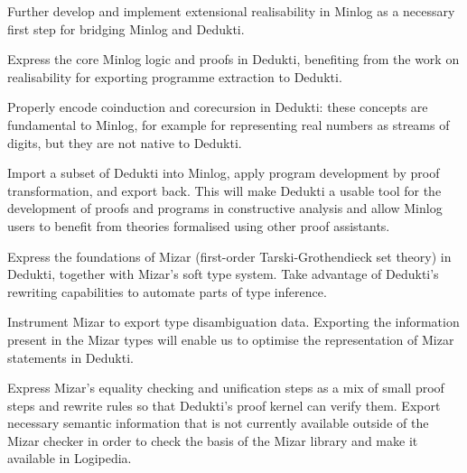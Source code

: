 \begin{workpackage}
\begin{tasklist}
\begin{task}[id=minlog,
  title=Express the theory of Minlog in Dedukti,
  shorttitle=Minlog,
  lead=Lmu,
  LmuRM=16, %
  wphases=1-30,
  ]
  \vspace{-5mm}
  \begin{compactitem}
  \item Further develop and implement extensional realisability in Minlog as
    a necessary first step for bridging Minlog and Dedukti.
  \item Express the core Minlog logic and proofs in Dedukti, benefiting from
    the work on realisability for exporting programme extraction to Dedukti.
  \item Properly encode coinduction and corecursion in Dedukti: these concepts are
    fundamental to Minlog, for example for representing real numbers as streams of
    digits, but they are not native to Dedukti.
  \item Import a subset of Dedukti into Minlog, apply program development by proof
    transformation, and export back. This will make Dedukti a usable tool for the
    development of proofs and programs in constructive analysis and allow Minlog
    users to benefit from theories formalised using other proof assistants.
  \end{compactitem}
\end{task}

\begin{task}[id=mizar,
  title=Express the theory of Mizar in Dedukti,
  shorttitle=Mizar,
  lead=Bia,   %
  BiaRM=70, %
  InnRM=12,   %
  wphases=1-48,
  ]
  \vspace{-5mm}
  \begin{compactitem}
  \item Express the foundations of Mizar (first-order Tarski-Grothendieck set
    theory) in Dedukti, together with Mizar's soft
    type system. Take advantage of Dedukti's rewriting capabilities to automate
    parts of type inference.
  \item Instrument Mizar to export type disambiguation data. Exporting the
    information present in the Mizar types will enable us to optimise the
    representation of Mizar statements in Dedukti.
  \item Express Mizar's equality checking and unification steps as a mix of
    small proof steps and rewrite rules so that Dedukti's proof kernel can
    verify them. Export necessary semantic information that is not currently
    available outside of the Mizar checker in order to check the basis of the
    Mizar library and make it available in Logipedia.
  \end{compactitem}
\end{task}


\end{tasklist}
\end{workpackage}
